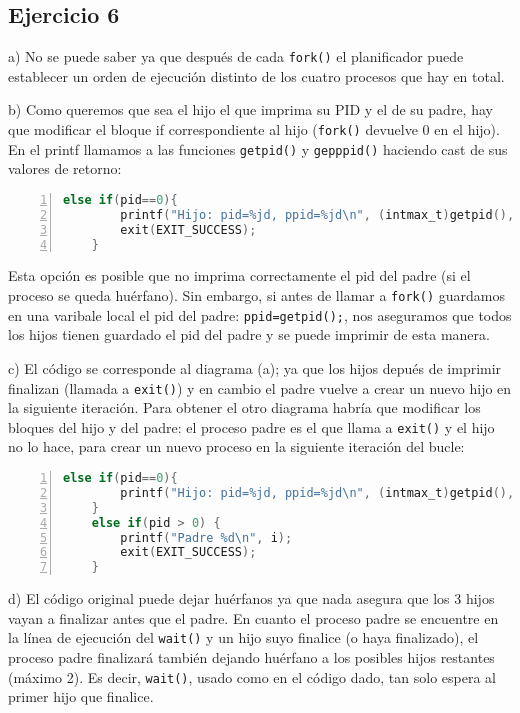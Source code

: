 \documentclass{article}
\begin{document}
\subsection*{Ejercicio 6}

a) No se puede saber ya que después de cada \texttt{fork()} el planificador puede establecer un orden de ejecución distinto de los cuatro procesos que hay en total.

b) Como queremos que sea el hijo el que imprima su PID y el de su padre, hay que modificar el bloque if correspondiente al hijo (\texttt{fork()} devuelve 0 en el hijo). En el printf llamamos a las funciones \texttt{getpid()} y \texttt{gepppid()} haciendo cast de sus valores de retorno:

\begin{lstlisting}[language=C, numbers=left]
    else if(pid==0){
        printf("Hijo: pid=%jd, ppid=%jd\n", (intmax_t)getpid(), (intmax_t)getppid());
        exit(EXIT_SUCCESS);
    }
\end{lstlisting}

Esta opción es posible que no imprima correctamente el pid del padre (si el proceso se queda huérfano). Sin embargo, si antes de llamar a \texttt{fork()} guardamos en una varibale local el pid del padre: \texttt{ppid=getpid();}, nos aseguramos que todos los hijos tienen guardado el pid del padre y se puede imprimir de esta manera.

c) El código se corresponde al diagrama (a); ya que los hijos depués de imprimir finalizan (llamada a \texttt{exit()}) y en cambio el padre vuelve a crear un nuevo hijo en la siguiente iteración. Para obtener el otro diagrama habría que modificar los bloques del hijo y del padre: el proceso padre es el que llama a \texttt{exit()} y el hijo no lo hace, para crear un nuevo proceso en la siguiente iteración del bucle:

\begin{lstlisting}[language=C, numbers=left]
    else if(pid==0){
        printf("Hijo: pid=%jd, ppid=%jd\n", (intmax_t)getpid(), (intmax_t)getppid());
    }
    else if(pid > 0) {
        printf("Padre %d\n", i);
        exit(EXIT_SUCCESS);
    }
\end{lstlisting}

d) El código original puede dejar huérfanos ya que nada asegura que los 3 hijos vayan a finalizar antes que el padre. En cuanto el proceso padre se encuentre en la línea de ejecución del \texttt{wait()} y un hijo suyo finalice (o haya finalizado), el proceso padre finalizará también dejando huérfano a los posibles hijos restantes (máximo 2). Es decir, \texttt{wait()}, usado como en el código dado, tan solo espera al primer hijo que finalice.
\end{document}
